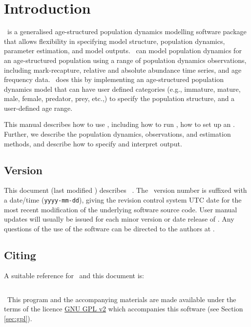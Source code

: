 \section{Introduction\label{sec:Introduction}}
\CNAME\ is a generalised age-structured population dynamics modelling software package that allows flexibility in specifying model structure, population dynamics, parameter estimation, and model outputs. \CNAME\ can model population dynamics for an age-structured population using a range of population dynamics observations, including mark-recapture, relative and absolute abundance time series, and age frequency data. \CNAME\ does this by implementing an age-structured population dynamics model that can have user defined categories (e.g., immature, mature, male, female, predator, prey, etc.,) to specify the population structure, and a user-defined age range. 

This manual describes how to use \CNAME, including how to run \CNAME, how to set up an \config. Further, we describe the population dynamics, observations, and estimation methods, and describe how to specify and interpret output. 

\subsection{Version\label{sec:version}}
This document (last modified \DocVer) describes \CNAME\ \VER. The \CNAME\ version number is suffixed with a date/time (\texttt{yyyy-mm-dd}), giving the revision control system UTC date for the most recent modification of the underlying software source code. User manual updates will usually be issued for each minor version or date release of \CNAME. Any questions of the use of the software can be directed to the authors at \email. 

\subsection{Citing \CNAME}
A suitable reference for \CNAME\ and this document is:

\ManualRef{}

\subsection{}
\
This program and the accompanying materials are made available under the terms of the licence \href{http://www.gnu.org/licenses/old-licenses/gpl-2.0.en.html}{GNU GPL v2} which accompanies this software (see Section \ref{sec:gpl}).

